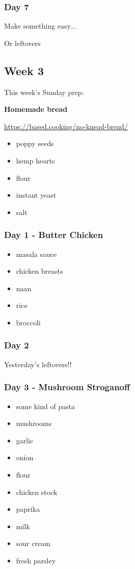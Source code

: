 \documentclass[11pt, a4paper]{article}
\begin{document}
\subsubsection{Day 7}
\vspace{1pc}
\noindent Make something easy...
\par
Or leftovers


\vspace{0.917 pc} %


\pagebreak
\subsection{Week 3}

This week's Sunday prep:
\par
\vspace{1pc}
\noindent\textbf{Homemade bread}
\par
\small{\url{https://based.cooking/no-knead-bread/}}
\begin{itemize}
\item poppy seeds
\item hemp hearts
\item flour
\item instant yeast
\item salt
\end{itemize}

\subsubsection{Day 1 - Butter Chicken}
\vspace{1pc}
\begin{itemize}
\item masala sauce
\item chicken breasts
\item naan
\item rice
\item broccoli 
\end{itemize}

\subsubsection{Day 2}
\vspace{1pc}
Yesterday's leftovers!!

\subsubsection{Day 3 - Mushroom Stroganoff}
\vspace{1pc}
\begin{itemize}
\item some kind of pasta
\item mushrooms
\item garlic 
\item onion
\item flour
\item chicken stock
\item paprika
\item milk
\item sour cream
\item fresh parsley
\end{itemize}
\end{document}

